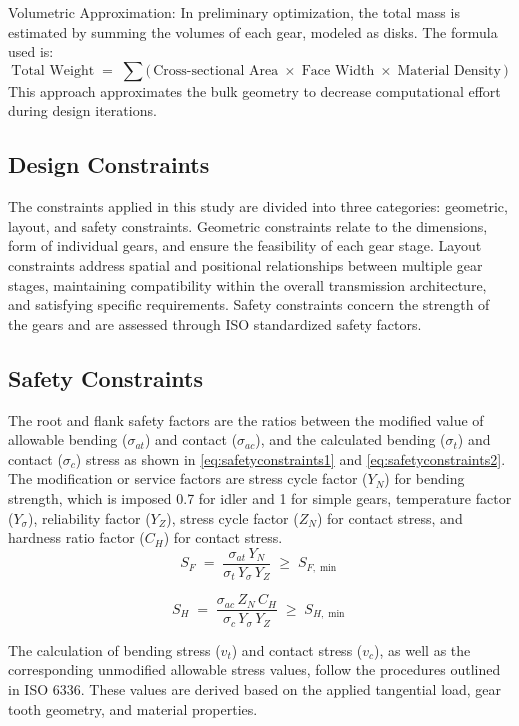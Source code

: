         Volumetric Approximation: In preliminary optimization, the total mass is estimated by summing the volumes 
        of each gear, modeled as disks. The formula used is: \[\text{Total Weight} \;=\;\sum \bigl(\,\text{Cross-sectional Area}\;\times\;\text{Face Width}\;\times\;\text{Material Density}\,\bigr)\]
        This approach approximates the bulk geometry to decrease computational effort during design iterations.

    \subsection{Design Constraints}
        The constraints applied in this study are divided into three categories: geometric, layout, and 
        safety constraints. Geometric constraints relate to the dimensions, form of individual gears, 
        and ensure the feasibility of each gear stage. Layout constraints address spatial and positional 
        relationships between multiple gear stages, maintaining compatibility within the overall 
        transmission architecture, and satisfying specific requirements. Safety constraints concern 
        the strength of the gears and are assessed through ISO standardized safety factors.

    \subsection{Safety Constraints}
        The root and flank safety factors are the ratios between the modified value of 
        allowable bending ($\sigma_{at}$) and contact ($\sigma_{ac}$), and the calculated bending ($\sigma_{t}$) and 
        contact ($\sigma_{c}$) stress as shown in \autoref{eq:safetyconstraints1} and \autoref{eq:safetyconstraints2}. The modification or service factors 
        are stress cycle factor ($Y_{N}$) for bending strength, which is imposed 0.7 for idler and 1 
        for simple gears, temperature factor ($Y_{\sigma}$), reliability factor ($Y_{Z}$), stress cycle factor ($Z_{N}$)
        for contact stress, and hardness ratio factor ($C_{H}$) for contact stress.
            \begin{equation}
                \label{eq:safetyconstraints1}
                S_F \;=\;
                \frac{\sigma_{\!at}\,Y_N}{\sigma_{\!t}\,Y_{\sigma}\,Y_Z}
                \;\ge\;S_{F,\min}
            \end{equation}

            \begin{equation}
                \label{eq:safetyconstraints2}
                S_H \;=\;
                \frac{\sigma_{\!ac}\,Z_N\,C_H}{\sigma_{\!c}\,Y_{\sigma}\,Y_Z}
                \;\ge\;S_{H,\min}
            \end{equation}
        
        The calculation of bending stress ($v_{t}$) and contact stress ($v_{c}$), as well as the corresponding 
        unmodified allowable stress values, follow the procedures outlined in ISO 6336. 
        These values are derived based on the applied tangential load, gear tooth geometry, 
        and material properties.